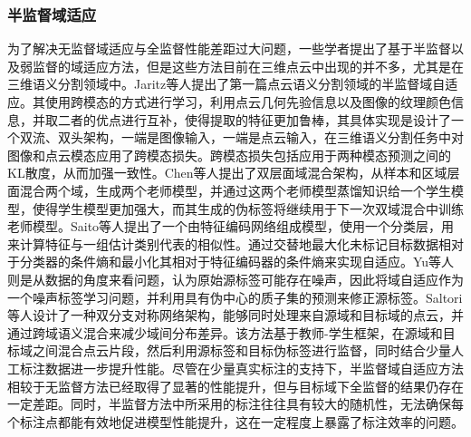 \subsubsection{半监督域适应}
为了解决无监督域适应与全监督性能差距过大问题，一些学者提出了基于半监督以及弱监督的域适应方法，但是这些方法目前在三维点云中出现的并不多，尤其是在三维语义分割领域中。Jaritz等人提出了第一篇点云语义分割领域的半监督域自适应。其使用跨模态的方式进行学习，利用点云几何先验信息以及图像的纹理颜色信息，并取二者的优点进行互补，使得提取的特征更加鲁棒，其具体实现是设计了一个双流、双头架构，一端是图像输入，一端是点云输入，在三维语义分割任务中对图像和点云模态应用了跨模态损失。跨模态损失包括应用于两种模态预测之间的KL散度，从而加强一致性。Chen等人提出了双层面域混合架构，从样本和区域层面混合两个域，生成两个老师模型，并通过这两个老师模型蒸馏知识给一个学生模型，使得学生模型更加强大，而其生成的伪标签将继续用于下一次双域混合中训练老师模型。Saito等人提出了一个由特征编码网络组成模型，使用一个分类层，用来计算特征与一组估计类别代表的相似性。通过交替地最大化未标记目标数据相对于分类器的条件熵和最小化其相对于特征编码器的条件熵来实现自适应。Yu等人则是从数据的角度来看问题，认为原始源标签可能存在噪声，因此将域自适应作为一个噪声标签学习问题，并利用具有伪中心的质子集的预测来修正源标签。Saltori等人设计了一种双分支对称网络架构，能够同时处理来自源域和目标域的点云，并通过跨域语义混合来减少域间分布差异。该方法基于教师-学生框架，在源域和目标域之间混合点云片段，然后利用源标签和目标伪标签进行监督，同时结合少量人工标注数据进一步提升性能。尽管在少量真实标注的支持下，半监督域自适应方法相较于无监督方法已经取得了显著的性能提升，但与目标域下全监督的结果仍存在一定差距。同时，半监督方法中所采用的标注往往具有较大的随机性，无法确保每个标注点都能有效地促进模型性能提升，这在一定程度上暴露了标注效率的问题。
